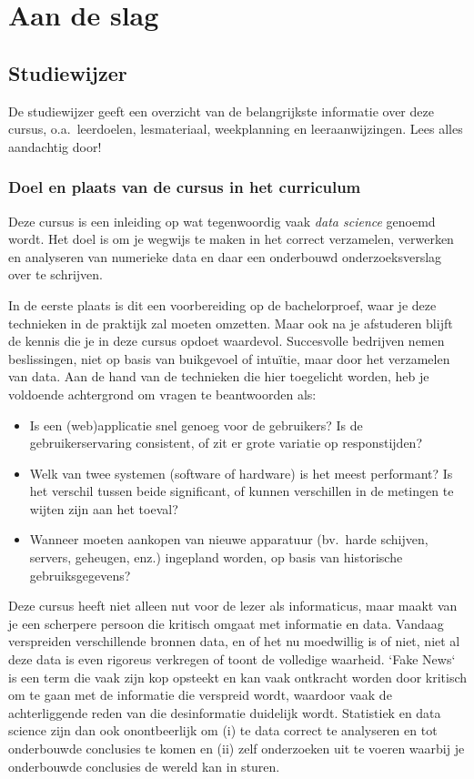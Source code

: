 \chapter{Aan de slag}
\label{ch:aan-de-slag}

\section{Studiewijzer}

De studiewijzer geeft een overzicht van de belangrijkste informatie over deze cursus, o.a.~leerdoelen, lesmateriaal, weekplanning en leeraanwijzingen. Lees alles aandachtig door!

\subsection{Doel en plaats van de cursus in het curriculum}

Deze cursus is een inleiding op wat tegenwoordig vaak \emph{data science} genoemd wordt. Het doel is om je wegwijs te maken in het correct verzamelen, verwerken en analyseren van numerieke data en daar een onderbouwd onderzoeksverslag over te schrijven.

In de eerste plaats is dit een voorbereiding op de bachelorproef, waar je deze technieken in de praktijk zal moeten omzetten. Maar ook na je afstuderen blijft de kennis die je in deze cursus opdoet waardevol. Succesvolle bedrijven nemen beslissingen, niet op basis van buikgevoel of intuïtie, maar door het verzamelen van data. Aan de hand van de technieken die hier toegelicht worden, heb je voldoende achtergrond om vragen te beantwoorden als:

\begin{itemize}
  \item Is een (web)applicatie snel genoeg voor de gebruikers? Is de gebruikerservaring consistent, of zit er grote variatie op responstijden?
  \item Welk van twee systemen (software of hardware) is het meest performant? Is het verschil tussen beide significant, of kunnen verschillen in de metingen te wijten zijn aan het toeval?
  \item Wanneer moeten aankopen van nieuwe apparatuur (bv.~harde schijven, servers, geheugen, enz.) ingepland worden, op basis van historische gebruiksgegevens?
\end{itemize}

Deze cursus heeft niet alleen nut voor de lezer als informaticus, maar maakt van je een scherpere persoon die kritisch omgaat met informatie en data. Vandaag verspreiden verschillende bronnen data, en of het nu moedwillig is of niet, niet al deze data is even rigoreus verkregen of toont de volledige waarheid. `Fake News` is een term die vaak zijn kop opsteekt en kan vaak ontkracht worden door kritisch om te gaan met de informatie die verspreid wordt, waardoor vaak de achterliggende reden van die desinformatie duidelijk wordt. Statistiek  en data science zijn dan ook onontbeerlijk om (i) te data correct te analyseren en tot onderbouwde conclusies te komen en (ii) zelf onderzoeken uit te voeren waarbij je onderbouwde conclusies de wereld kan in sturen. 



